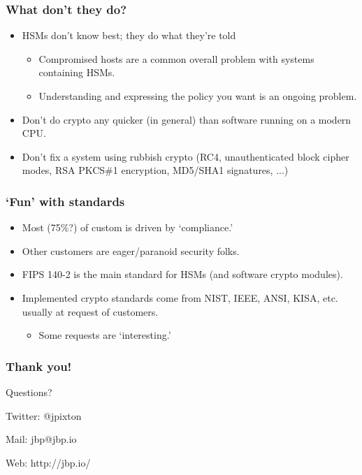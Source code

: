 \documentclass{beamer}
\begin{document}
\frame
{
  \frametitle{What don't they do?}

  \begin{itemize}
    \item<1-> HSMs don't know best; they do what they're told
    \begin{itemize}
      \item<2-> Compromised hosts are a common overall problem with systems containing HSMs.
                

      \item<4-> Understanding and expressing the policy you want is an ongoing problem.
    \end{itemize}

    \item<5-> Don't do crypto any quicker (in general) than software running on a modern CPU.
    \item<6-> Don't fix a system using rubbish crypto (RC4, unauthenticated block cipher modes, RSA PKCS\#1 encryption, MD5/SHA1 signatures, ...)
  \end{itemize}
}

\frame
{
  \frametitle{`Fun' with standards}

  \begin{itemize}
    \item<1-> Most (75\%?) of custom is driven by `compliance.'
    \item<2-> Other customers are eager/paranoid security folks.
  \end{itemize}

  \begin{itemize}
    \item<3-> FIPS 140-2 is the main standard for HSMs (and software crypto modules).
    \item<4-> Implemented crypto standards come from NIST, IEEE, ANSI, KISA, etc. usually at request of customers.
      \begin{itemize}
        \item<5-> Some requests are `interesting.'
      \end{itemize}
  \end{itemize}
}

\frame
{
  \frametitle{Thank you!}
  Questions?

  \vspace{5em}

  Twitter: @jpixton

  Mail: jbp@jbp.io
  
  Web: http://jbp.io/
}
\end{document}
